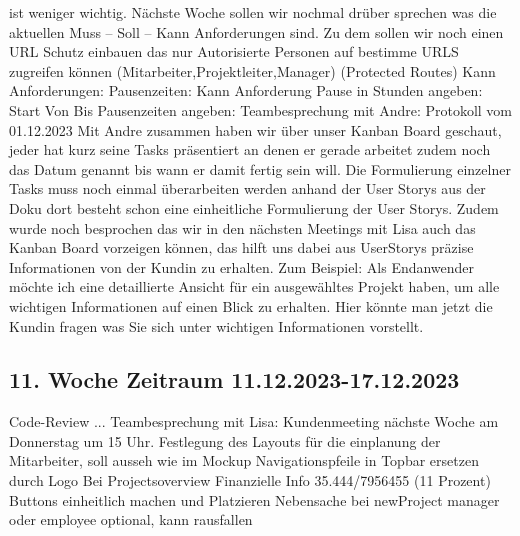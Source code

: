 \documentclass{article}
\begin{document}
ist weniger wichtig. Nächste Woche sollen wir nochmal drüber sprechen was die
aktuellen Muss – Soll – Kann Anforderungen sind. Zu dem sollen wir noch einen
URL Schutz einbauen das nur Autorisierte Personen auf bestimme URLS zugreifen
können (Mitarbeiter,Projektleiter,Manager) (Protected Routes) Kann
Anforderungen: Pausenzeiten: Kann Anforderung Pause in Stunden angeben: Start
Von Bis Pausenzeiten angeben: Teambesprechung mit Andre: Protokoll vom
01.12.2023 Mit Andre zusammen haben wir über unser Kanban Board geschaut, jeder
hat kurz seine Tasks präsentiert an denen er gerade arbeitet zudem noch das
Datum genannt bis wann er damit fertig sein will. Die Formulierung einzelner
Tasks muss noch einmal überarbeiten werden anhand der User Storys aus der Doku
dort besteht schon eine einheitliche Formulierung der User Storys. Zudem wurde
noch besprochen das wir in den nächsten Meetings mit Lisa auch das Kanban Board
vorzeigen können, das hilft uns dabei aus UserStorys präzise Informationen von
der Kundin zu erhalten. Zum Beispiel: Als Endanwender möchte ich eine
detaillierte Ansicht für ein ausgewähltes Projekt haben, um alle wichtigen
Informationen auf einen Blick zu erhalten. Hier könnte man jetzt die Kundin
fragen was Sie sich unter wichtigen Informationen vorstellt.

\subsection{11. Woche Zeitraum 11.12.2023-17.12.2023}
Code-Review ...
Teambesprechung mit Lisa:
Kundenmeeting nächste Woche am Donnerstag um 15 Uhr.
Festlegung des Layouts für die einplanung der Mitarbeiter, soll ausseh wie im Mockup
Navigationspfeile in Topbar ersetzen durch Logo
Bei Projectsoverview Finanzielle Info 35.444/7956455  (11 Prozent)
Buttons einheitlich machen und Platzieren
Nebensache bei newProject manager oder employee optional, kann rausfallen




\end{document}
